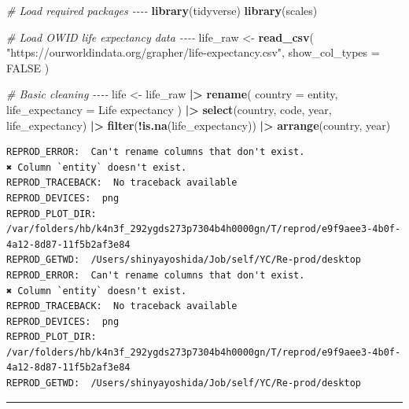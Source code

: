 \documentclass[
  11pt,
]{article}
\newenvironment{Shaded}{\begin{snugshade}}{\end{snugshade}}
\newcommand{\AttributeTok}[1]{\textcolor[rgb]{0.13,0.29,0.53}{#1}}
\newcommand{\CommentTok}[1]{\textcolor[rgb]{0.56,0.35,0.01}{\textit{#1}}}
\newcommand{\ConstantTok}[1]{\textcolor[rgb]{0.56,0.35,0.01}{#1}}
\newcommand{\FunctionTok}[1]{\textcolor[rgb]{0.13,0.29,0.53}{\textbf{#1}}}
\newcommand{\NormalTok}[1]{#1}
\newcommand{\OtherTok}[1]{\textcolor[rgb]{0.56,0.35,0.01}{#1}}
\newcommand{\SpecialCharTok}[1]{\textcolor[rgb]{0.81,0.36,0.00}{\textbf{#1}}}
\newcommand{\StringTok}[1]{\textcolor[rgb]{0.31,0.60,0.02}{#1}}
\newenvironment{rpoutput}{\vspace{0.5em}\begin{snugshade}}{\end{snugshade}}
\begin{document}
\begin{Shaded}
\begin{Highlighting}[]
\CommentTok{\# Load required packages {-}{-}{-}{-}}
\FunctionTok{library}\NormalTok{(tidyverse)}
\FunctionTok{library}\NormalTok{(scales)}

\CommentTok{\# Load OWID life expectancy data {-}{-}{-}{-}}
\NormalTok{life\_raw }\OtherTok{\textless{}{-}} \FunctionTok{read\_csv}\NormalTok{(}
  \StringTok{"https://ourworldindata.org/grapher/life{-}expectancy.csv"}\NormalTok{,}
  \AttributeTok{show\_col\_types =} \ConstantTok{FALSE}
\NormalTok{)}

\CommentTok{\# Basic cleaning {-}{-}{-}{-}}
\NormalTok{life }\OtherTok{\textless{}{-}}\NormalTok{ life\_raw }\SpecialCharTok{|\textgreater{}}
  \FunctionTok{rename}\NormalTok{(}
    \AttributeTok{country =}\NormalTok{ entity,}
    \AttributeTok{life\_expectancy =} \StringTok{\textasciigrave{}}\AttributeTok{Life expectancy}\StringTok{\textasciigrave{}}
\NormalTok{  ) }\SpecialCharTok{|\textgreater{}}
  \FunctionTok{select}\NormalTok{(country, code, year, life\_expectancy) }\SpecialCharTok{|\textgreater{}}
  \FunctionTok{filter}\NormalTok{(}\SpecialCharTok{!}\FunctionTok{is.na}\NormalTok{(life\_expectancy)) }\SpecialCharTok{|\textgreater{}}
  \FunctionTok{arrange}\NormalTok{(country, year)}
\end{Highlighting}
\end{Shaded}

\begin{rpoutput}

\begin{verbatim}
REPROD_ERROR:  Can't rename columns that don't exist.
✖ Column `entity` doesn't exist. 
REPROD_TRACEBACK:  No traceback available  
REPROD_DEVICES:  png 
REPROD_PLOT_DIR:  /var/folders/hb/k4n3f_292ygds273p7304b4h0000gn/T/reprod/e9f9aee3-4b0f-4a12-8d87-11f5b2af3e84 
REPROD_GETWD:  /Users/shinyayoshida/Job/self/YC/Re-prod/desktop 
REPROD_ERROR:  Can't rename columns that don't exist.
✖ Column `entity` doesn't exist. 
REPROD_TRACEBACK:  No traceback available  
REPROD_DEVICES:  png 
REPROD_PLOT_DIR:  /var/folders/hb/k4n3f_292ygds273p7304b4h0000gn/T/reprod/e9f9aee3-4b0f-4a12-8d87-11f5b2af3e84 
REPROD_GETWD:  /Users/shinyayoshida/Job/self/YC/Re-prod/desktop 
\end{verbatim}

\end{rpoutput}

\begin{center}\rule{0.5\linewidth}{0.5pt}\end{center}
\end{document}
